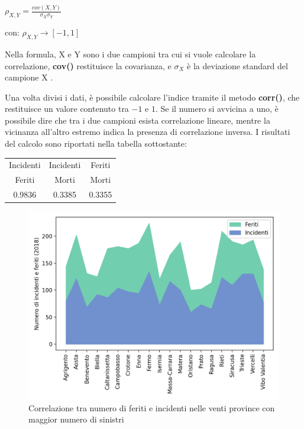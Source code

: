 \documentclass[a4paper,12pt]{report}
\newcommand{\methodstyle}[1]{\textbf{#1}}
\begin{document}
\begin{center}
    $\rho_{X, Y} = \displaystyle \frac{cov(X, Y)}{\sigma_X \sigma_Y}$
\end{center}

\begin{center}
    con: $\rho_{X, Y} \rightarrow [-1, 1]$
\end{center}

Nella formula, X e Y sono i due campioni tra cui si vuole calcolare la correlazione, 
\methodstyle{cov()} restituisce la covarianza, e $\sigma_X$ è la deviazione standard del 
campione X \cite{PROB_E_STATISTICA:1}. 

Una volta divisi i dati, è possibile calcolare l'indice tramite il metodo 
\methodstyle{corr()}, che restituisce un valore contenuto tra $-1$ e $1$. 
Se il numero si avvicina a uno, è possibile dire che tra i due campioni esista correlazione 
lineare, mentre la vicinanza all'altro estremo indica la presenza di correlazione inversa. 
I risultati del calcolo sono riportati nella tabella sottostante: 

\begin{center}
    \def\arraystretch{1.5}%
    \begin{tabular}{ |c|c|c| } 
    \hline
    Incidenti & Incidenti & Feriti \\ 
    Feriti & Morti & Morti \\ 
    \hline
    0.9836 & 0.3385 & 0.3355 \\ 
    \hline
    \end{tabular}
\end{center}

\begin{figure}
    \includegraphics[width=\linewidth]{../src/incidenti/incidenti_aci/provincia/corr_incidenti.png}
    \caption{Correlazione tra numero di feriti e incidenti nelle venti province con maggior numero di sinistri}
    \label{fig:corr-incidenti-feriti}
\end{figure}
\end{document}
